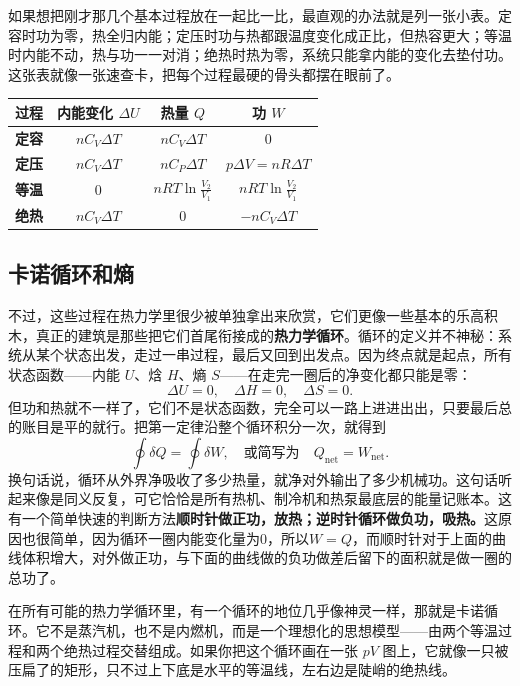 \documentclass[UTF8]{ctexbook}
\begin{document}
如果想把刚才那几个基本过程放在一起比一比，最直观的办法就是列一张小表。定容时功为零，热全归内能；定压时功与热都跟温度变化成正比，但热容更大；等温时内能不动，热与功一一对消；绝热时热为零，系统只能拿内能的变化去垫付功。这张表就像一张速查卡，把每个过程最硬的骨头都摆在眼前了。

\begin{center}
\begin{tabular}{|c|c|c|c|}
\hline
\textbf{过程} & \textbf{内能变化 $\Delta U$} & \textbf{热量 $Q$} & \textbf{功 $W$} \\
\hline
\textbf{定容} & $nC_V\Delta T$ & $nC_V\Delta T$ & $0$ \\
\hline
\textbf{定压} & $nC_V\Delta T$ & $nC_P\Delta T$ & $p\Delta V = nR\Delta T$ \\
\hline
\textbf{等温} & $0$ & $nRT\ln\frac{V_2}{V_1}$ & $nRT\ln\frac{V_2}{V_1}$ \\
\hline
\textbf{绝热} & $nC_V\Delta T$ & $0$ & $-nC_V\Delta T$ \\
\hline
\end{tabular}
\end{center}

\subsection{卡诺循环和熵}

不过，这些过程在热力学里很少被单独拿出来欣赏，它们更像一些基本的乐高积木，真正的建筑是那些把它们首尾衔接成的\textbf{热力学循环}。循环的定义并不神秘：系统从某个状态出发，走过一串过程，最后又回到出发点。因为终点就是起点，所有状态函数——内能 $U$、焓 $H$、熵 $S$——在走完一圈后的净变化都只能是零：
\[
\Delta U = 0,\quad \Delta H = 0,\quad \Delta S = 0.
\]
但功和热就不一样了，它们不是状态函数，完全可以一路上进进出出，只要最后总的账目是平的就行。把第一定律沿整个循环积分一次，就得到
\[
\oint \delta Q = \oint \delta W,
\quad\text{或简写为}\quad Q_{\text{net}} = W_{\text{net}}.
\]
换句话说，循环从外界净吸收了多少热量，就净对外输出了多少机械功。这句话听起来像是同义反复，可它恰恰是所有热机、制冷机和热泵最底层的能量记账本。这有一个简单快速的判断方法\textbf{顺时针做正功，放热；逆时针循环做负功，吸热。}这原因也很简单，因为循环一圈内能变化量为0，所以$W=Q$，而顺时针对于上面的曲线体积增大，对外做正功，与下面的曲线做的负功做差后留下的面积就是做一圈的总功了。

在所有可能的热力学循环里，有一个循环的地位几乎像神灵一样，那就是卡诺循环。它不是蒸汽机，也不是内燃机，而是一个理想化的思想模型——由两个等温过程和两个绝热过程交替组成。如果你把这个循环画在一张 $pV$ 图上，它就像一只被压扁了的矩形，只不过上下底是水平的等温线，左右边是陡峭的绝热线。
\end{document}
